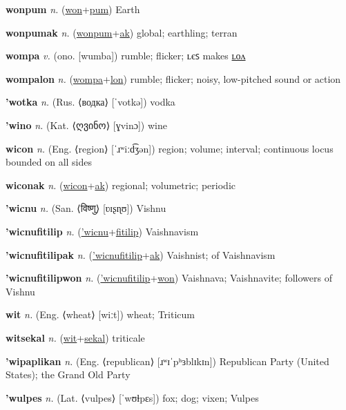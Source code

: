 \textbf{\hypertarget{wonpum}{wonpum}} \textit{n.} (\hyperlink{won}{won}+\allowbreak \hyperlink{pum}{pum})
Earth

\textbf{\hypertarget{wonpumak}{wonpumak}} \textit{n.} (\hyperlink{wonpum}{wonpum}+\allowbreak \hyperlink{ak}{ak})
global; earthling; terran

\textbf{\hypertarget{wompa}{wompa}} \textit{v.} (ono. [wumba])
rumble; flicker; ʟєꜱ makes \hyperlink{wompalon}{ʟᴏᴧ}

\textbf{\hypertarget{wompalon}{wompalon}} \textit{n.} (\hyperlink{wompa}{wompa}+\allowbreak \hyperlink{lon}{lon})
rumble; flicker; noisy, low-pitched sound or action

\textbf{\hypertarget{'wotka}{'wotka}} \textit{n.} (Rus. ⟨водка⟩ [ˈvotkə])
vodka

\textbf{\hypertarget{'wino}{'wino}} \textit{n.} (Kat. ⟨{\georgian{}ღვინო}⟩ [ɣvinɔ])
wine

\textbf{\hypertarget{wicon}{wicon}} \textit{n.} (Eng. ⟨region⟩ [ˈɹʷiːd͡ʒən])
region; volume; interval; continuous locus bounded on all sides

\textbf{\hypertarget{wiconak}{wiconak}} \textit{n.} (\hyperlink{wicon}{wicon}+\allowbreak \hyperlink{ak}{ak})
regional; volumetric; periodic

\textbf{\hypertarget{'wicnu}{'wicnu}} \textit{n.} (San. ⟨{\devanagari{}विष्णु}⟩ [ʋɪʂɳʊ])
Vishnu

\textbf{\hypertarget{'wicnufitilip}{'wicnufitilip}} \textit{n.} (\hyperlink{'wicnu}{'wicnu}+\allowbreak \hyperlink{fitilip}{fitilip})
Vaishnavism

\textbf{\hypertarget{'wicnufitilipak}{'wicnufitilipak}} \textit{n.} (\hyperlink{'wicnufitilip}{'wicnufitilip}+\allowbreak \hyperlink{ak}{ak})
Vaishnist; of Vaishnavism

\textbf{\hypertarget{'wicnufitilipwon}{'wicnufitilipwon}} \textit{n.} (\hyperlink{'wicnufitilip}{'wicnufitilip}+\allowbreak \hyperlink{won}{won})
Vaishnava; Vaishnavite; followers of Vishnu

\textbf{\hypertarget{wit}{wit}} \textit{n.} (Eng. ⟨wheat⟩ [wiːt])
wheat; Triticum

\textbf{\hypertarget{witsekal}{witsekal}} \textit{n.} (\hyperlink{wit}{wit}+\allowbreak \hyperlink{sekal}{sekal})
triticale

\textbf{\hypertarget{'wipaplikan}{'wipaplikan}} \textit{n.} (Eng. ⟨republican⟩ [ɹʷɪˈpʰɜblɪkɪn])
Republican Party (United States); the Grand Old Party

\textbf{\hypertarget{'wulpes}{'wulpes}} \textit{n.} (Lat. ⟨vulpes⟩ [ˈwʊɫpɛs])
fox; dog; vixen; Vulpes

